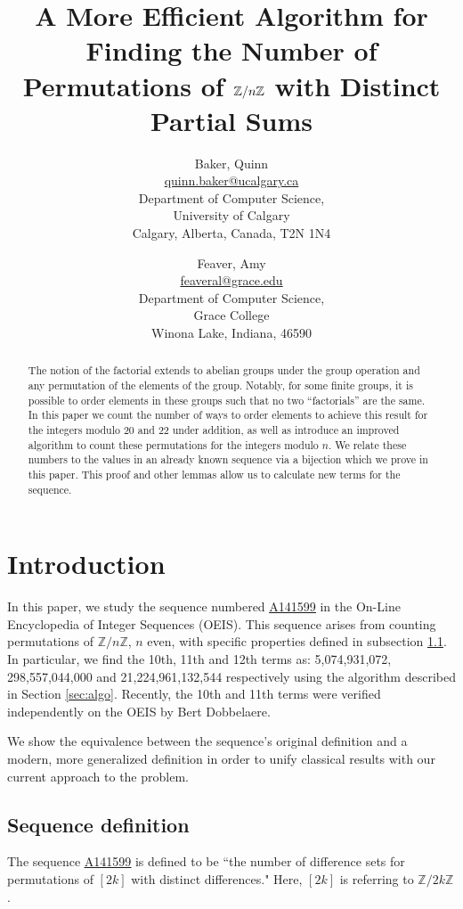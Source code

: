 \documentclass[12pt]{article}
\title{A More Efficient Algorithm for Finding the Number of Permutations of $\ZZ/n\ZZ$ with Distinct Partial Sums}
\author{Baker, Quinn\\
\href{mailto:quinn.baker@ucalgary.ca}{quinn.baker@ucalgary.ca}\\
Department of Computer Science,\\
University of Calgary\\
Calgary, Alberta, Canada, T2N 1N4
\and 
Feaver, Amy \\
\href{mailto:feaveral@grace.edu}{feaveral@grace.edu}\\
Department of Computer Science,\\
Grace College\\
Winona Lake, Indiana, 46590
}
\date{}
\theoremstyle{plain}
\theoremstyle{definition}
\theoremstyle{remark}
\newcommand{\ZZ}{\mathbb{Z}}
\newcommand{\seqnum}[1]{\href{https://oeis.org/#1}{\textrm \underline{#1}}}
\begin{document}
\begin{titlepage}
\maketitle
\end{titlepage}

\begin{abstract}The notion of the factorial extends to abelian groups under the group operation and any permutation of the elements of the group. Notably, for some finite groups, it is possible to order elements in these groups such that no two ``factorials'' are the same. In this paper we count the number of ways to order elements to achieve this result for the integers modulo 20 and 22 under addition,  as well as introduce an improved algorithm to count these permutations for the integers modulo $n$.  We relate these numbers to the values in an already known sequence via a bijection which we prove in this paper. This proof and other lemmas allow us to calculate new terms for the sequence.
\end{abstract}


\section{Introduction}

In this paper, we study the sequence numbered \seqnum{A141599} in the On-Line Encyclopedia of Integer Sequences (OEIS)\cite{OEIS}. This sequence arises from counting permutations of $\ZZ/n\ZZ$, $n$ even, with specific properties defined in subsection \ref{traddef}.  In particular, we find the 10th, 11th and 12th terms as: 5,074,931,072, 298,557,044,000 and 21,224,961,132,544  respectively using the algorithm described in Section \ref{sec:algo}. Recently, the 10th and 11th terms were verified independently on the OEIS by Bert Dobbelaere.

We show the equivalence between the sequence's original definition and a modern, more generalized definition in order to unify classical results with our current approach to the problem. 

\subsection{Sequence definition}\label{traddef}

The sequence \seqnum{A141599} is defined to be ``the number of difference sets for permutations of $[2k]$ with distinct differences." Here, $[2k]$ is referring to $\ZZ/2k\ZZ$. 
\end{document}
